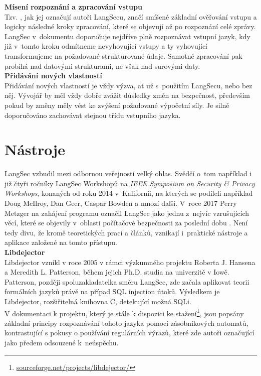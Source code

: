 \textbf{Mísení rozpoznání a zpracování vstupu} \\
Tzv. , jak jej označují autoři LangSecu, značí smíšené základní ověřování vstupu a logicky následné kroky zpracování,
které se objevují až po rozpoznání celé zprávy. 
LangSec v~dokumentu \cite{LangSecBof} doporučuje nejdříve plně rozpoznávat vstupní jazyk, kdy již v~tomto kroku odmítneme nevyhovující vstupy a ty
vyhovující transformujeme na požadované strukturované údaje. Samotné zpracování pak probíhá nad datovými strukturami, ne však nad surovými daty. \\

\textbf{Přidávání nových vlastností} \\
Přidávání nových vlastností je vždy výzva, ať už s~použitím LangSecu, nebo bez něj. Vývojář by měl vždy dobře zvážit důsledky změn na bezpečnost,
především pokud by změny měly vést ke zvýšení požadované výpočetní síly. Je silně doporučováno zachovávat stejnou třídu vstupního jazyka. 

\section{Nástroje} \label{sec:5:tools}
LangSec vzbudil mezi odbornou veřejností velký ohlas. 
Svědčí o~tom například i již čtyři ročníky LangSec Workshopů na \textit{IEEE Symposium on Security \& Privacy Workshops}, konaných od roku 2014 
v~Kalifornii, na kterých se podíleli například Doug McIlroy, Dan Geer, Caspar Bowden a mnozí další. V~roce 2017 Perry Metzger na zahájení programu 
označil LangSec jako jednu z~nejvíc vzrušujících věcí, které se objevily v~oblasti počítačové bezpečnosti za poslední dobu \cite{spw17key}. Není 
tedy divu, že kromě teoretických prací a článků, vznikají i~praktické nástroje a aplikace založené na tomto přístupu. \\

\Bat{} \textbf{Libdejector} \\
Libdejector vznikl v roce 2005 v rámci výzkumného projektu Roberta J. Hansena a Meredith L. Patterson, během jejich Ph.D. studia na univerzitě v Iowě. 
Patterson, později spoluzakladatelka směru LangSec, zde začala aplikovat teorii formálních jazyků právě na případ SQL injection útoků.
Výsledkem je Libdejector, rozšiřitelná knihovna C, detekující možná SQLi. \\

V dokumentaci k projektu, který je stále k dispozici ke stažení\footnote{\url{sourceforge.net/projects/libdejector/}}, jsou popsány základní principy
rozpoznávání tohoto jazyka pomocí zásobníkových automatů, kontrastující s pokusy o používání regulárních výrazů, které zde autoři označující jako předem odsouzené
k~neúspěchu. \\

